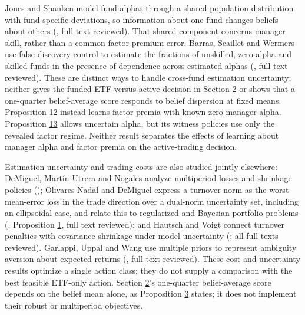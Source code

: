 \documentclass[11pt]{article}
\begin{document}
Jones and Shanken model fund alphas through a shared population distribution
with fund-specific deviations, so information about one fund changes beliefs
about others (\cite{jones2002mutual}, full text reviewed). That shared
component concerns manager skill, rather than a common factor-premium error.
Barras, Scaillet and Wermers use false-discovery control to estimate the
fractions of unskilled, zero-alpha and skilled funds in the presence of
dependence across estimated alphas (\cite{barras2010false}, full text reviewed).
These are distinct ways to handle cross-fund estimation uncertainty; neither
gives the funded ETF-versus-active decision in Section \hyperref[sec:2]{2} or shows that a one-quarter
belief-average score responds to belief dispersion at fixed means. Proposition \hyperref[res:Proposition-12]{12}
instead learns factor premia with known zero manager alpha. Proposition \hyperref[res:Proposition-13]{13}
allows uncertain alpha, but its witness policies use only the revealed factor
regime. Neither result separates the effects of learning about manager alpha
and factor premia on the active-trading decision.

Estimation uncertainty and trading costs are also studied jointly elsewhere: DeMiguel,
Martín-Utrera and Nogales analyze multiperiod losses and shrinkage policies
(\cite{demiguel2013parameter}); Olivares-Nadal and DeMiguel express a turnover norm as
the worst mean-error loss in the trade direction over a dual-norm uncertainty set,
including an ellipsoidal case, and relate this to regularized and Bayesian
portfolio problems (\cite{olivaresnadal2018technical}, Proposition \hyperref[res:Proposition-1]{1}, full text
reviewed); and Hautsch and Voigt connect turnover penalties with covariance
shrinkage under model uncertainty
(\cite{hautsch2017large}; all full texts reviewed). Garlappi, Uppal and Wang use multiple
priors to represent ambiguity aversion about expected returns (\cite{garlappi2005portfolio},
full text reviewed). These cost and uncertainty results optimize a single action class;
they do not supply a comparison with the best feasible ETF-only action. Section \hyperref[sec:2]{2}'s
one-quarter belief-average score depends on the belief mean alone, as Proposition \hyperref[res:Proposition-3]{3}
states; it does not implement their robust or multiperiod objectives.
\end{document}
